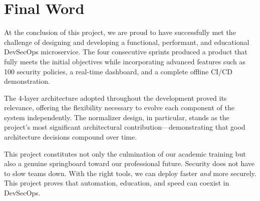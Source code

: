 \section*{Final Word}

At the conclusion of this project, we are proud to have successfully met the challenge of designing and developing a functional, performant, and educational DevSecOps microservice. The four consecutive sprints produced a product that fully meets the initial objectives while incorporating advanced features such as 100 security policies, a real-time dashboard, and a complete offline CI/CD demonstration.

The 4-layer architecture adopted throughout the development proved its relevance, offering the flexibility necessary to evolve each component of the system independently. The normalizer design, in particular, stands as the project's most significant architectural contribution—demonstrating that good architecture decisions compound over time.

This project constitutes not only the culmination of our academic training but also a genuine springboard toward our professional future. Security does not have to slow teams down. With the right tools, we can deploy faster \textit{and} more securely. This project proves that automation, education, and speed can coexist in DevSecOps.
